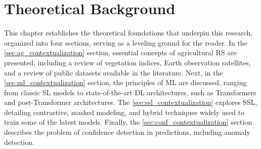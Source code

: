 \chapter{Theoretical Background}\label{chapter:theoretical_background}

This chapter establishes the theoretical foundations that underpin this research, organized into four sections, serving as a leveling ground for the reader. In the \autoref{sec:ag_contextualization} section, essential concepts of agricultural \ac{RS} are presented, including a review of vegetation indices, Earth observation satellites, and a review of public datasets available in the literature. Next, in the \autoref{sec:ml_contextualization} section, the principles of \ac{ML} are discussed, ranging from classic \ac{SL} models to state-of-the-art \ac{DL} architectures, such as Transformers and post-Transformer architectures. The \autoref{sec:ssl_contextualization} explores \ac{SSL}, detailing contrastive, masked modeling, and hybrid techniques widely used to train some of the latest models. Finally, the \autoref{sec:conf_contextualization} section describes the problem of confidence detection in predictions, including anomaly detection.





